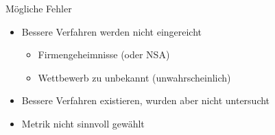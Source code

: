 \documentclass{beamer}
\begin{document}
\begin{frame}[plain]{Mögliche Fehler}
    \begin{itemize}
        \item Bessere Verfahren werden nicht eingereicht
        \begin{itemize}
            \item Firmengeheimnisse (oder NSA)
            \item Wettbewerb zu unbekannt (unwahrscheinlich)
        \end{itemize}
        \item Bessere Verfahren existieren, wurden aber nicht untersucht
        \item Metrik nicht sinnvoll gewählt
    \end{itemize}
\end{frame}
\end{document}
